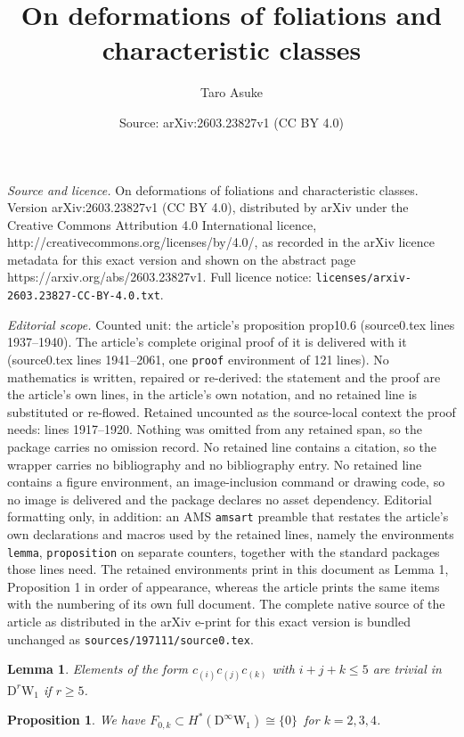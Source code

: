 \documentclass[10pt,a4paper]{amsart}
\title{On deformations of foliations and characteristic classes}
\author{Taro Asuke}
\date{Source: arXiv:2603.23827v1 (CC BY 4.0)}
\newtheorem{lemma}{Lemma}
\newtheorem{proposition}{Proposition}
\newcommand{\D}{\mathrm{D}}
\newcommand{\W}{\mathrm{W}}
\begin{document}
\maketitle

\noindent\emph{Source and licence.} On deformations of foliations and characteristic classes. Version arXiv:2603.23827v1 (CC BY 4.0), distributed by arXiv under the Creative Commons Attribution 4.0 International licence, http://creativecommons.org/licenses/by/4.0/, as recorded in the arXiv licence metadata for this exact version and shown on the abstract page https://arxiv.org/abs/2603.23827v1. Full licence notice: \texttt{licenses/arxiv-2603.23827-CC-BY-4.0.txt}.\par\smallskip

\noindent\textit{Editorial scope.} Counted unit: the article's proposition prop10.6 (source0.tex lines 1937--1940). The article's complete original proof of it is delivered with it (source0.tex lines 1941--2061, one \texttt{proof} environment of 121 lines). No mathematics is written, repaired or re-derived: the statement and the proof are the article's own lines, in the article's own notation, and no retained line is substituted or re-flowed.  Retained uncounted as the source-local context the proof needs: lines 1917--1920.  Nothing was omitted from any retained span, so the package carries no omission record.  No retained line contains a citation, so the wrapper carries no bibliography and no bibliography entry.  No retained line contains a figure environment, an image-inclusion command or drawing code, so no image is delivered and the package declares no asset dependency.  Editorial formatting only, in addition: an AMS \texttt{amsart} preamble that restates the article's own declarations and macros used by the retained lines, namely the environments \texttt{lemma}, \texttt{proposition} on separate counters, together with the standard packages those lines need.  The retained environments print in this document as Lemma 1, Proposition 1 in order of appearance, whereas the article prints the same items with the numbering of its own full document.  The complete native source of the article as distributed in the arXiv e-print for this exact version is bundled unchanged as \texttt{sources/197111/source0.tex}.
\begin{lemma}
\label{lem10.8}
Elements of the form $c_{(i)}c_{(j)}c_{(k)}$ with $i+j+k\leq5$ are trivial in~$\D^r\W_1$ if $r\geq5$.
\end{lemma}

\begin{proposition}
\label{prop10.6}
We have $F_{0,k}\subset H^*(\D^\infty\W_1)\cong\{0\}$\, for $k=2,3,4$.
\end{proposition}
\end{document}
